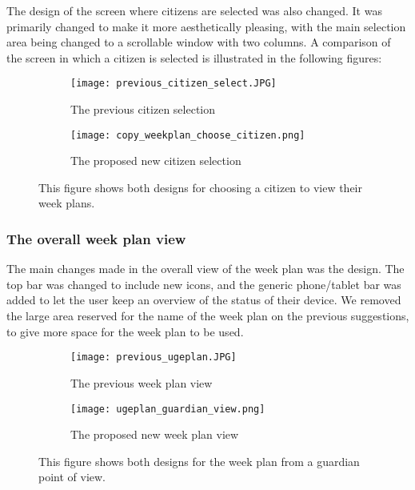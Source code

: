 \noindent
The design of the screen where citizens are selected was also changed.
It was  primarily changed to make it more aesthetically pleasing, with the main selection area being changed to a scrollable window with two columns. 
A comparison of the screen in which a citizen is selected is illustrated in the following figures:
\begin{figure}[H]
    \begin{subfigure}{0.5\textwidth}
    \texttt{[image: previous\_citizen\_select.JPG]} 
    \caption{The previous citizen selection}
    \label{fig:previous_citizen_select}
    \end{subfigure}
    \begin{subfigure}{0.5\textwidth}
        \texttt{[image: copy\_weekplan\_choose\_citizen.png]}
    \caption{The proposed new citizen selection}
    \label{fig:new_citizen_select}
    \end{subfigure} 
    \caption{This figure shows both designs for choosing a citizen to view their week plans.}
    \label{fig:citizen_select}
\end{figure}
\noindent

\subsubsection{The overall week plan view}
The main changes made in the overall view of the week plan was the design. 
The top bar was changed to include new icons, and the generic phone/tablet bar was added to let the user keep an overview of the status of their device.
We removed the large area reserved for the name of the week plan on the previous suggestions, to give more space for the week plan to be used. 
\begin{figure}[H]
    \begin{subfigure}{0.5\textwidth}
    \texttt{[image: previous\_ugeplan.JPG]} 
    \caption{The previous week plan view}
    \label{fig:previous_weekplan_view}
    \end{subfigure}
    \begin{subfigure}{0.5\textwidth}
        \texttt{[image: ugeplan\_guardian\_view.png]}
    \caption{The proposed new week plan view}
    \label{fig:new_weekplan_view}
    \end{subfigure} 
    \caption{This figure shows both designs for the week plan from a guardian point of view.}
    \label{fig:weekplan_view}
\end{figure}


